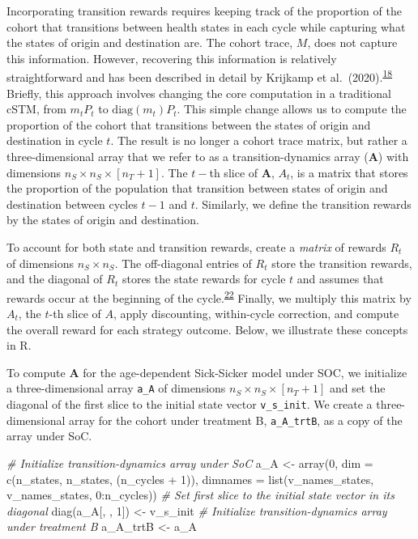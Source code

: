 \documentclass[
]{article}
\newenvironment{Shaded}{\begin{snugshade}}{\end{snugshade}}
\newcommand{\AttributeTok}[1]{\textcolor[rgb]{0.77,0.63,0.00}{#1}}
\newcommand{\CommentTok}[1]{\textcolor[rgb]{0.56,0.35,0.01}{\textit{#1}}}
\newcommand{\DecValTok}[1]{\textcolor[rgb]{0.00,0.00,0.81}{#1}}
\newcommand{\FunctionTok}[1]{\textcolor[rgb]{0.00,0.00,0.00}{#1}}
\newcommand{\NormalTok}[1]{#1}
\newcommand{\OtherTok}[1]{\textcolor[rgb]{0.56,0.35,0.01}{#1}}
\newcommand{\SpecialCharTok}[1]{\textcolor[rgb]{0.00,0.00,0.00}{#1}}
\begin{document}
Incorporating transition rewards requires keeping track of the proportion of the cohort that transitions between health states in each cycle while capturing what the states of origin and destination are. The cohort trace, \(M\), does not capture this information. However, recovering this information is relatively straightforward and has been described in detail by Krijkamp et al.~(2020).\textsuperscript{\protect\hyperlink{ref-Krijkamp2019}{18}} Briefly, this approach involves changing the core computation in a traditional cSTM, from \(m_t P_t\) to \(\text{diag}(m_t) P_t\). This simple change allows us to compute the proportion of the cohort that transitions between the states of origin and destination in cycle \(t\). The result is no longer a cohort trace matrix, but rather a three-dimensional array that we refer to as a transition-dynamics array (\(\mathbf{A}\)) with dimensions \(n_S \times n_S \times [n_T+1]\). The \(t-\)th slice of \(\mathbf{A}\), \(A_t\), is a matrix that stores the proportion of the population that transition between states of origin and destination between cycles \(t-1\) and \(t\). Similarly, we define the transition rewards by the states of origin and destination.

To account for both state and transition rewards, create a \emph{matrix} of rewards \(R_t\) of dimensions \(n_S \times n_S\). The off-diagonal entries of \(R_t\) store the transition rewards, and the diagonal of \(R_t\) stores the state rewards for cycle \(t\) and assumes that rewards occur at the beginning of the cycle.\textsuperscript{\protect\hyperlink{ref-Krijkamp2019}{22}} Finally, we multiply this matrix by \(A_t\), the \(t\)-th slice of \(A\), apply discounting, within-cycle correction, and compute the overall reward for each strategy outcome. Below, we illustrate these concepts in R.

To compute \(\mathbf{A}\) for the age-dependent Sick-Sicker model under SOC, we initialize a three-dimensional array \texttt{a\_A} of dimensions \(n_S \times n_S \times [n_T+1]\) and set the diagonal of the first slice to the initial state vector \texttt{v\_s\_init}. We create a three-dimensional array for the cohort under treatment B, \texttt{a\_A\_trtB}, as a copy of the array under SoC.

\begin{Shaded}
\begin{Highlighting}[]
\CommentTok{\# Initialize transition{-}dynamics array under SoC}
\NormalTok{a\_A }\OtherTok{\textless{}{-}} \FunctionTok{array}\NormalTok{(}\DecValTok{0}\NormalTok{,}
             \AttributeTok{dim =} \FunctionTok{c}\NormalTok{(n\_states, n\_states, (n\_cycles }\SpecialCharTok{+} \DecValTok{1}\NormalTok{)),}
             \AttributeTok{dimnames =} \FunctionTok{list}\NormalTok{(v\_names\_states, v\_names\_states, }\DecValTok{0}\SpecialCharTok{:}\NormalTok{n\_cycles))}
\CommentTok{\# Set first slice to the initial state vector in its diagonal}
\FunctionTok{diag}\NormalTok{(a\_A[, , }\DecValTok{1}\NormalTok{]) }\OtherTok{\textless{}{-}}\NormalTok{ v\_s\_init}
\CommentTok{\# Initialize transition{-}dynamics array under treatment B}
\NormalTok{a\_A\_trtB }\OtherTok{\textless{}{-}}\NormalTok{ a\_A}
\end{Highlighting}
\end{Shaded}
\end{document}
